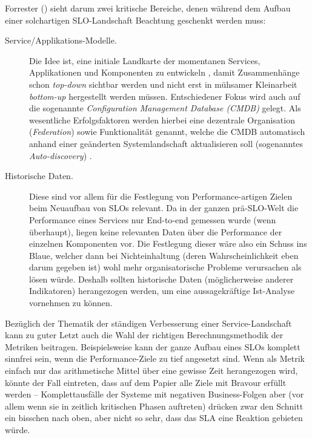 \documentclass[11pt,listof=totoc]{scrreprt} %
\theoremstyle{definition}
\begin{document}
Forrester (\cite{forrester:slaBestPractices}) sieht darum zwei kritische Bereiche, denen während dem Aufbau einer solchartigen SLO-Landschaft Beachtung geschenkt werden muss:
\begin{description}
\item[Service/Applikations-Modelle.] Die Idee ist, eine initiale Landkarte der momentanen Services, Applikationen und Komponenten zu entwickeln \cite{forrester:slaBestPractices}, damit Zusammenhänge schon {\em top-down} sichtbar werden und nicht erst in mühsamer Kleinarbeit {\em bottom-up} hergestellt werden müssen. Entschiedener Fokus wird auch auf die sogenannte {\em Configuration Management Database (CMDB)} gelegt. Als wesentliche Erfolgsfaktoren werden hierbei eine dezentrale Organisation ({\em Federation}) sowie Funktionalität genannt, welche die CMDB automatisch anhand einer geänderten Systemlandschaft aktualisieren soll (sogenanntes {\em Auto-discovery}) \cite{forrester:implementingBsm}.
\item[Historische Daten.] Diese sind vor allem für die Festlegung von Performance-artigen Zielen beim Neuaufbau von SLOs relevant. Da in der ganzen prä-SLO-Welt die Performance eines Services nur End-to-end gemessen wurde (wenn überhaupt), liegen keine relevanten Daten über die Performance der einzelnen Komponenten vor. Die Festlegung dieser wäre also ein Schuss ins Blaue, welcher dann bei Nichteinhaltung (deren Wahrscheinlichkeit eben darum gegeben ist) wohl mehr organisatorische Probleme verursachen als lösen würde. Deshalb sollten historische Daten (möglicherweise anderer Indikatoren) herangezogen werden, um eine aussagekräftige Ist-Analyse vornehmen zu können.
\end{description}

Bezüglich der Thematik der ständigen Verbesserung einer Service-Landschaft kann zu guter Letzt auch die Wahl der richtigen Berechnungsmethodik der Metriken beitragen. Beispielsweise kann der ganze Aufbau eines SLOs komplett sinnfrei sein, wenn die Performance-Ziele zu tief angesetzt sind. Wenn als Metrik einfach nur das arithmetische Mittel über eine gewisse Zeit herangezogen wird, könnte der Fall eintreten, dass auf dem Papier alle Ziele mit Bravour erfüllt werden -- Komplettausfälle der Systeme mit negativen Business-Folgen aber (vor allem wenn sie in zeitlich kritischen Phasen auftreten) drücken zwar den Schnitt ein bisschen nach oben, aber nicht so sehr, dass das SLA eine Reaktion gebieten würde.
\end{document}
